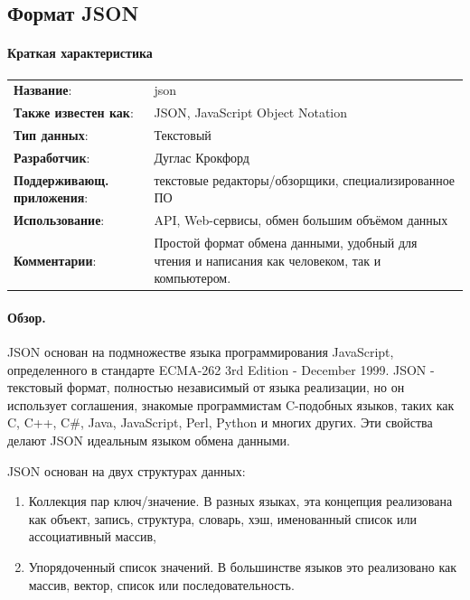 \subsection{Формат JSON} \label{subs:json}
\paragraph{Краткая характеристика}

\begin{longtable}{p{110pt} p{340pt}}
	\label{tab:svg}
	\centering
	\textbf{Название}:&json\\
	\textbf{Также известен как}:&JSON, JavaScript Object Notation\\
	\textbf{Тип данных}:&Текстовый\\
	\textbf{Разработчик}:&Дуглас Крокфорд\\
	\textbf{Поддерживающ. приложения}:&текстовые редакторы/обзорщики, специализированное ПО\\
	\textbf{Использование}:&API, Web-сервисы, обмен большим объёмом данных\\
	\textbf{Комментарии}:&Простой формат обмена данными, удобный для чтения и написания как человеком, так и компьютером.\\
\end{longtable}

\paragraph{Обзор.}
JSON основан на подмножестве языка программирования JavaScript, определенного в стандарте ECMA-262 3rd Edition - December 1999. JSON - текстовый формат, полностью независимый от языка реализации, но он использует соглашения, знакомые программистам C-подобных языков, таких как C, C++, C\#, Java, JavaScript, Perl, Python и многих других. Эти свойства делают JSON идеальным языком обмена данными.

JSON основан на двух структурах данных:
\begin{enumerate}[1)]
	\item Коллекция пар ключ/значение. В разных языках, эта концепция реализована как объект, запись, структура, словарь, хэш, именованный список или ассоциативный массив, 
	\item Упорядоченный список значений. В большинстве языков это реализовано как массив, вектор, список или последовательность.
\end{enumerate}

